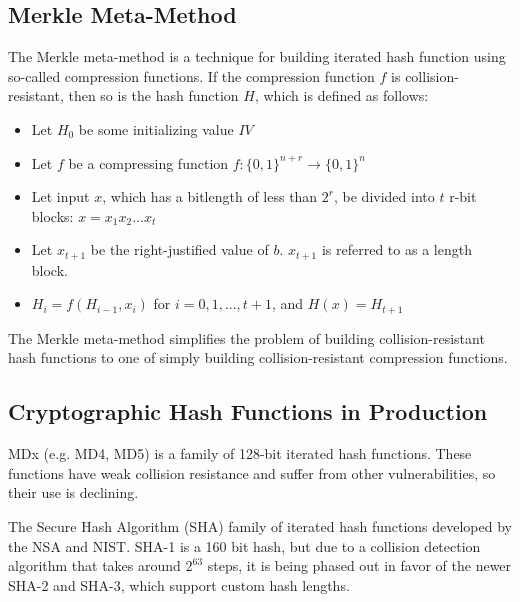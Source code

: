 \documentclass[12pt,titlepage]{article}
\begin{document}
    \subsection{Merkle Meta-Method}
      The Merkle meta-method is a technique for building iterated hash function using so-called compression functions. If the compression function $f$ is collision-resistant,
      then so is the hash function $H$, which is defined as follows:
        \begin{itemize}
          \item Let $H_0$ be some initializing value $IV$
          \item Let $f$ be a compressing function $f : \{0, 1\}^{n+r} \rightarrow \{0, 1\}^n$
          \item Let input $x$, which has a bitlength of less than $2^r$, be divided into $t$ r-bit blocks: $x = x_1x_2 . . . x_t$
          \item Let $x_{t+1}$ be the right-justified value of $b$. $x_{t+1}$ is referred to as a length block.
          \item $H_i = f(H_{i-1}, x_i)$ for $i = 0, 1, ..., t + 1$, and $H(x) = H_{t+1}$
        \end{itemize}

      The Merkle meta-method simplifies the problem of building collision-resistant hash functions to one of simply building collision-resistant compression functions.

    \subsection{Cryptographic Hash Functions in Production}
      MDx (e.g. MD4, MD5) is a family of 128-bit iterated hash functions. These functions have weak collision resistance and suffer from other vulnerabilities, so their use
      is declining.

      The Secure Hash Algorithm (SHA) family of iterated hash functions developed by the NSA and NIST. SHA-1 is a 160 bit hash, but due to a collision detection algorithm
      that takes around $2^{63}$ steps, it is being phased out in favor of the newer SHA-2 and SHA-3, which support custom hash lengths.
\end{document}
